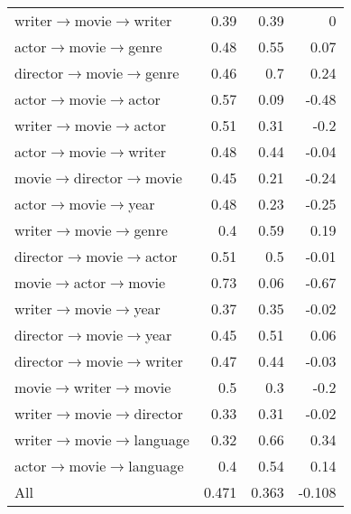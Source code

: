 \documentclass[11pt]{article}
\renewcommand\:{\colon} \newcommand{\sset}[1]{\left\{\,#1\,\right\}} \newcommand{\ssets}[1]{\left\{#1\right\}} \newcommand{\ssetn}[1]{\{\,#1\,\}}
\begin{document}
\begin{table*}[!htb]
{\begin{minipage}{.6\linewidth}
\begin{tabular}{@{}lrrr@{}}
writer$\rightarrow$movie$\rightarrow$writer     & 0.39 & 0.39 & \cellcolor[HTML]{FFFFFF}0     \\
\rowcolor[HTML]{FFFFFF} 
actor$\rightarrow$movie$\rightarrow$genre       & 0.48 & 0.55 & \cellcolor[HTML]{E2F4EB}0.07  \\
\rowcolor[HTML]{FFFFFF} 
director$\rightarrow$movie$\rightarrow$genre    & 0.46 & 0.7  & \cellcolor[HTML]{9BD7B9}0.24  \\
\rowcolor[HTML]{FFFFFF} 
actor$\rightarrow$movie$\rightarrow$actor       & 0.57 & 0.09 & \cellcolor[HTML]{EDA19A}-0.48 \\
\rowcolor[HTML]{FFFFFF} 
writer$\rightarrow$movie$\rightarrow$actor      & 0.51 & 0.31 & \cellcolor[HTML]{F7D7D5}-0.2  \\
\rowcolor[HTML]{FFFFFF} 
actor$\rightarrow$movie$\rightarrow$writer      & 0.48 & 0.44 & \cellcolor[HTML]{FDF7F6}-0.04 \\
\rowcolor[HTML]{FFFFFF} 
movie$\rightarrow$director$\rightarrow$movie    & 0.45 & 0.21 & \cellcolor[HTML]{F6D0CC}-0.24 \\
\rowcolor[HTML]{FFFFFF} 
actor$\rightarrow$movie$\rightarrow$year        & 0.48 & 0.23 & \cellcolor[HTML]{F5CECA}-0.25 \\
\rowcolor[HTML]{FFFFFF} 
writer$\rightarrow$movie$\rightarrow$genre      & 0.4  & 0.59 & \cellcolor[HTML]{B0DFC8}0.19  \\
\rowcolor[HTML]{FFFFFF} 
director$\rightarrow$movie$\rightarrow$actor    & 0.51 & 0.5  & \cellcolor[HTML]{FEFDFC}-0.01 \\
\rowcolor[HTML]{FFFFFF} 
movie$\rightarrow$actor$\rightarrow$movie       & 0.73 & 0.06 & \cellcolor[HTML]{E67C73}-0.67 \\
\rowcolor[HTML]{FFFFFF} 
writer$\rightarrow$movie$\rightarrow$year       & 0.37 & 0.35 & \cellcolor[HTML]{FEFBFA}-0.02 \\
\rowcolor[HTML]{FFFFFF} 
director$\rightarrow$movie$\rightarrow$year     & 0.45 & 0.51 & \cellcolor[HTML]{E6F5EE}0.06  \\
\rowcolor[HTML]{FFFFFF} 
director$\rightarrow$movie$\rightarrow$writer   & 0.47 & 0.44 & \cellcolor[HTML]{FDF9F8}-0.03 \\
\rowcolor[HTML]{FFFFFF} 
movie$\rightarrow$writer$\rightarrow$movie      & 0.5  & 0.3  & \cellcolor[HTML]{F7D7D5}-0.2  \\
\rowcolor[HTML]{FFFFFF} 
writer$\rightarrow$movie$\rightarrow$director   & 0.33 & 0.31 & \cellcolor[HTML]{FEFBFA}-0.02 \\
writer$\rightarrow$movie$\rightarrow$language   & 0.32 & 0.66 & \cellcolor[HTML]{71C69C}0.34  \\
actor$\rightarrow$movie$\rightarrow$language    & 0.4  & 0.54 & \cellcolor[HTML]{C5E8D7}0.14  \\ \midrule
All                               & 0.471 & 0.363 & -0.108                      \\ \bottomrule
\end{tabular}


\end{minipage}}
\end{table*}
\end{document}
